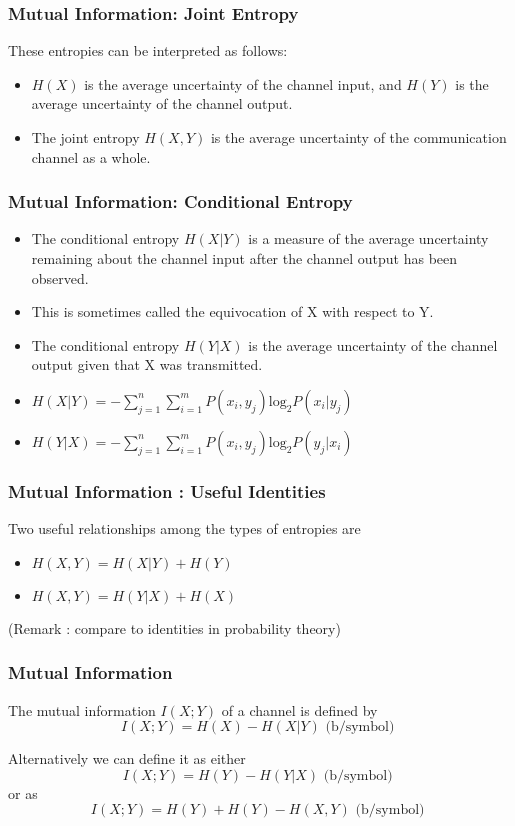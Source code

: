 \documentclass[a4]{beamer}
\begin{document}
\begin{frame}
\frametitle{Mutual Information: Joint Entropy}
These entropies can be interpreted as follows:\begin{itemize}\item $ H(X)$ is the average uncertainty of the channel input,
and $H(Y)$ is the average uncertainty of the channel output.\item  The joint entropy $H(X,Y)$ is the average uncertainty of the communication channel as a
whole.\end{itemize}
\end{frame}
\begin{frame}
\frametitle{Mutual Information: Conditional Entropy}
\begin{itemize}
\item The conditional entropy $H(X|Y)$ is a
measure of the average uncertainty remaining about the channel input after the channel output has
been observed. \item This is sometimes called the equivocation of X with respect to Y.  \item The
conditional entropy $H(Y|X)$ is the average uncertainty of the channel output given that X was
transmitted.
\end{itemize}
\begin{itemize}
\item $H(X| Y)= - \sum ^{n}_{j=1}\sum ^{m}_{i=1} P(x_i,y_j) \mbox{log}_2 P(x_i|y_j)$
\item $H(Y|X)= - \sum ^{n}_{j=1}\sum ^{m}_{i=1} P(x_i,y_j) \mbox{log}_2 P(y_j|x_i)$
\end{itemize}
\end{frame}
\begin{frame}
\frametitle{Mutual Information : Useful Identities}
Two useful relationships among the types of entropies are
\begin{itemize}
\item $H(X,Y)=H(X|Y)+H(Y) $
\item $H(X,Y)=H(Y|X)+H(X) $
\end{itemize}
(Remark : compare to identities in probability theory)
\end{frame}
\begin{frame}

\frametitle{Mutual Information}
The mutual information $I(X; Y)$ of a channel is defined by
\[ I(X; Y) = H(X) -  H(X|Y) \mbox{    (b/symbol) } \]

Alternatively we can define it as either
\[ I(X; Y) = H(Y) -  H(Y|X) \mbox{     (b/symbol) } \]
 or as
\[ I(X; Y) = H(Y)+ H(Y)  - H(X,Y) \mbox{    (b/symbol) } \]
\end{frame}
\end{document}
